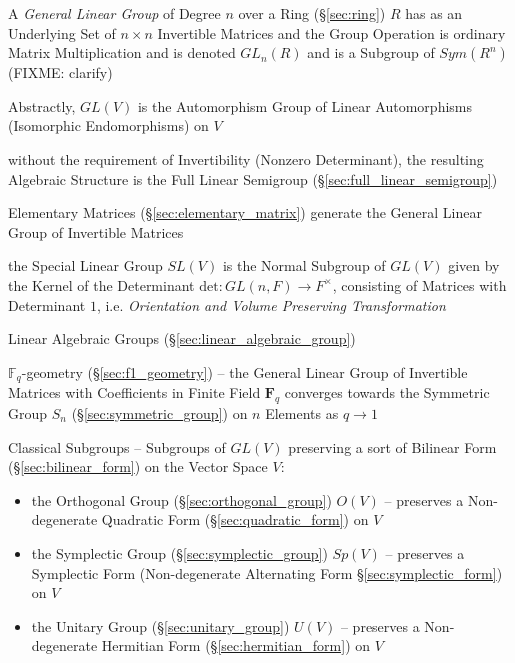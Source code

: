 A \emph{General Linear Group} of Degree $n$ over a Ring (\S\ref{sec:ring}) $R$
has as an Underlying Set of $n \times n$ Invertible Matrices and the Group
Operation is ordinary Matrix Multiplication and is denoted $GL_n(R)$ and is a
Subgroup of $Sym(R^n)$ (FIXME: clarify)

Abstractly, $GL(V)$ is the Automorphism Group of Linear Automorphisms
(Isomorphic Endomorphisms) on $V$

without the requirement of Invertibility (Nonzero Determinant), the resulting
Algebraic Structure is the Full Linear Semigroup
(\S\ref{sec:full_linear_semigroup})

Elementary Matrices (\S\ref{sec:elementary_matrix}) generate the General Linear
Group of Invertible Matrices

the Special Linear Group $SL(V)$ is the Normal Subgroup of $GL(V)$ given by the
Kernel of the Determinant $\mathrm{det} : GL(n,F) \rightarrow F^\times$,
consisting of Matrices with Determinant $1$, i.e. \emph{Orientation and Volume
  Preserving Transformation}

\fist Linear Algebraic Groups (\S\ref{sec:linear_algebraic_group})

\fist $\mathbb{F}_q$-geometry (\S\ref{sec:f1_geometry}) -- the General Linear
Group of Invertible Matrices with Coefficients in Finite Field $\mathbf{F}_q$
converges towards the Symmetric Group $S_n$ (\S\ref{sec:symmetric_group}) on $n$
Elements as $q \rightarrow 1$

Classical Subgroups -- Subgroups of $GL(V)$ preserving a sort of Bilinear Form
(\S\ref{sec:bilinear_form}) on the Vector Space $V$:
\begin{itemize}
  \item the Orthogonal Group (\S\ref{sec:orthogonal_group}) $O(V)$ -- preserves
    a Non-degenerate Quadratic Form (\S\ref{sec:quadratic_form}) on $V$
  \item the Symplectic Group (\S\ref{sec:symplectic_group}) $Sp(V)$
    -- preserves a Symplectic Form (Non-degenerate Alternating Form
    \S\ref{sec:symplectic_form}) on $V$
  \item the Unitary Group (\S\ref{sec:unitary_group}) $U(V)$
    -- preserves a Non-degenerate Hermitian Form (\S\ref{sec:hermitian_form})
    on $V$
\end{itemize}

